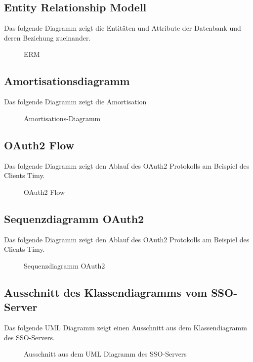 \subsection{Entity Relationship Modell}
\label{app:ERM}
Das folgende Diagramm zeigt die Entitäten und Attribute der Datenbank und deren Beziehung zueinander.
\begin{figure}[htb]
\centering
{}
\caption{ERM}
\end{figure}
\clearpage

\subsection{Amortisationsdiagramm}
\label{app:Amortisationsdiagramm}
Das folgende Diagramm zeigt die Amortisation
\begin{figure}[htb]
\centering
{}
\caption{Amortisations-Diagramm}
\end{figure}
\clearpage

\subsection{OAuth2 Flow}
\label{app:oauth2flow}
Das folgende Diagramm zeigt den Ablauf des OAuth2 Protokolls am Beispiel des Clients Timy.
\begin{figure}[htb]
\centering
{}
\caption{OAuth2 Flow}
\end{figure}
\clearpage

\subsection{Sequenzdiagramm OAuth2}
\label{app:sequenzdiagramm}
Das folgende Diagramm zeigt den Ablauf des OAuth2 Protokolls am Beispiel des Clients Timy.
\begin{figure}[htb]
\centering
{}
\caption{Sequenzdiagramm OAuth2}
\end{figure}
\clearpage



\subsection{Ausschnitt des Klassendiagramms vom SSO-Server}
\label{app:passport-controllers}
Das folgende UML Diagramm zeigt einen Ausschnitt aus dem Klassendiagramm des \ac{SSO}-Servers.
\begin{figure}[htb]
\centering
{}
\caption{Ausschnitt aus dem UML Diagramm des SSO-Servers}
\end{figure}
\clearpage

